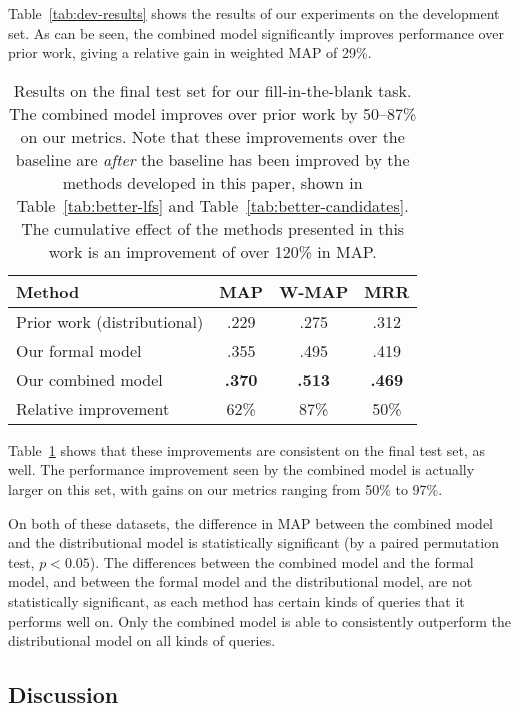 \documentclass[11pt]{article}
\newcommand{\tabref}[1]{Table~\ref{tab:#1}}
\begin{document}
\tabref{dev-results} shows the results of our experiments on the
development set.  As can be seen, the combined model significantly
improves performance over prior work, giving a relative gain in
weighted MAP of 29\%.

\begin{table}
  \centering
  {\small
    \begin{tabular}{lccc}
      \toprule
      Method & MAP & W-MAP & MRR \\
      \midrule
      Prior work (distributional) & .229 & .275 & .312 \\
      \midrule
      Our formal model & .355 & .495 & .419 \\
      \midrule
      Our combined model & \textbf{.370} & \textbf{.513} & \textbf{.469} \\
      \midrule
      \midrule
      Relative improvement & 62\% & 87\% & 50\% \\
      \bottomrule
    \end{tabular}
  }
  \caption{Results on the final test set for our fill-in-the-blank
  task.  The combined model improves over prior work by 50--87\% on
  our metrics.  Note that these improvements over the baseline are
  \emph{after} the baseline has been improved by the methods developed
  in this paper, shown in \tabref{better-lfs} and
  \tabref{better-candidates}.  The cumulative effect of the methods
  presented in this work is an improvement of over 120\% in MAP.}
  \label{tab:final-results}
\end{table}

\tabref{final-results} shows that these improvements are consistent on
the final test set, as well.  The performance improvement seen by the
combined model is actually larger on this set, with gains on our
metrics ranging from 50\% to 97\%.

On both of these datasets, the difference in MAP between the combined
model and the distributional model is statistically significant (by a
paired permutation test, $p < 0.05$).  The differences between the
combined model and the formal model, and between the formal model and
the distributional model, are not statistically significant, as each
method has certain kinds of queries that it performs well on.  Only
the combined model is able to consistently outperform the
distributional model on all kinds of queries.

\subsection{Discussion}
\end{document}
